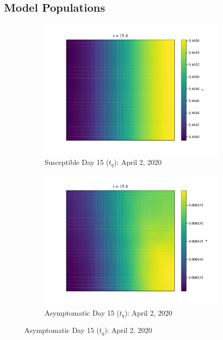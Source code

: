 \documentclass[11pt]{article}
\begin{document}
	\subsection*{Model Populations}
		\begin{figure}[H]
			\centering
			\begin{subfigure}{0.5\textwidth}
				\includegraphics[width=\textwidth]{susceptible_15}
				\caption{Susceptible Day 15 ($t_q$): April 2, 2020}
			\end{subfigure}%
			\begin{subfigure}{0.5\textwidth}
				\includegraphics[width=\textwidth]{asymptomatic_15}
				\caption{Asymptomatic Day 15 ($t_q$): April 2, 2020}
			\end{subfigure}
			

\end{figure}
\end{document}
